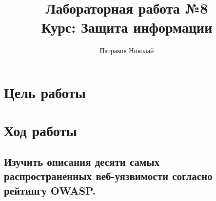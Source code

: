 \documentclass{article}
\title{Лабораторная работа №8 \\ Курс: Защита информации}
\author{Патраков Николай}
\begin{document}
	\maketitle
	\clearpage
	\tableofcontents
 \clearpage

\section{Цель работы}
\section{Ход работы}

\subsection{Изучить описания десяти самых распространенных веб-уязвимости согласно рейтингу OWASP.}
\end{document}
